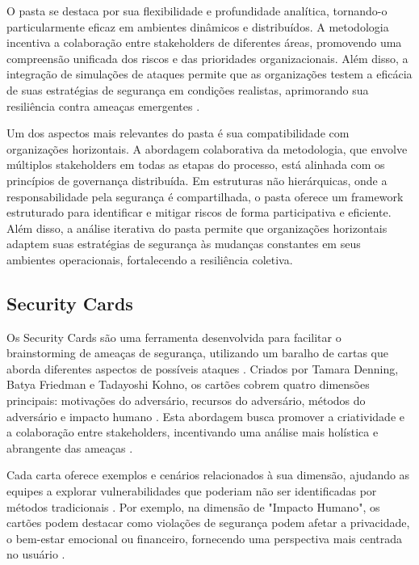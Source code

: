 O \gls{pasta} se destaca por sua flexibilidade e profundidade analítica,
tornando-o particularmente eficaz em ambientes dinâmicos e
distribuídos. A metodologia incentiva a colaboração entre stakeholders
de diferentes áreas, promovendo uma compreensão unificada dos riscos e
das prioridades organizacionais. Além disso, a integração de
simulações de ataques permite que as organizações testem a eficácia de
suas estratégias de segurança em condições realistas, aprimorando sua
resiliência contra ameaças emergentes
\cite{RiskCentricThreatModeling}.

Um dos aspectos mais relevantes do \gls{pasta} é sua compatibilidade com
organizações horizontais. A abordagem colaborativa da metodologia, que
envolve múltiplos stakeholders em todas as etapas do processo, está
alinhada com os princípios de governança distribuída. Em estruturas
não hierárquicas, onde a responsabilidade pela segurança é
compartilhada, o \gls{pasta} oferece um framework estruturado para
identificar e mitigar riscos de forma participativa e eficiente. Além
disso, a análise iterativa do \gls{pasta} permite que organizações
horizontais adaptem suas estratégias de segurança às mudanças
constantes em seus ambientes operacionais, fortalecendo a resiliência
coletiva.

\subsection{Security Cards}
\label{subsec:security_cards}

Os Security Cards são uma ferramenta desenvolvida para facilitar o
brainstorming de ameaças de segurança, utilizando um baralho de cartas
que aborda diferentes aspectos de possíveis ataques
\cite{SecurityCardsToolkit}. Criados por Tamara Denning, Batya
Friedman e Tadayoshi Kohno, os cartões cobrem quatro dimensões
principais: motivações do adversário, recursos do adversário, métodos
do adversário e impacto humano \cite{KeepingAheadofOurAdversaries}.
Esta abordagem busca promover a criatividade e a colaboração entre
stakeholders, incentivando uma análise mais holística e abrangente das
ameaças \cite{CyberThreatModeling}.

Cada carta oferece exemplos e cenários relacionados à sua dimensão,
ajudando as equipes a explorar vulnerabilidades que poderiam não ser
identificadas por métodos tradicionais \cite{SecurityCardsToolkit}.
Por exemplo, na dimensão de "Impacto Humano", os cartões podem
destacar como violações de segurança podem afetar a privacidade, o
bem-estar emocional ou financeiro, fornecendo uma perspectiva mais
centrada no usuário \cite{KeepingAheadofOurAdversaries}.

